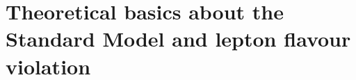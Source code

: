 \documentclass[12pt,twoside]{report}
\begin{document}


%

\tableofcontents

\chapter{Theoretical basics about the Standard Model and lepton flavour violation}


%
\end{document}
